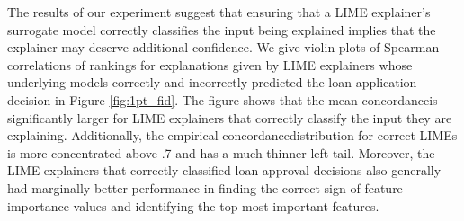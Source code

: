 \documentclass[mnsc,blindrev]{informs3}
\begin{document}
            The results of our experiment suggest that ensuring that a LIME explainer's surrogate model correctly classifies the input being explained implies that the explainer may deserve additional confidence. We give violin plots of Spearman correlations of rankings for explanations given by LIME explainers whose underlying models correctly and incorrectly predicted the loan application decision in Figure \ref{fig:1pt_fid}. The figure shows that the mean concordanceis significantly larger for LIME explainers that correctly classify the input they are explaining. Additionally, the empirical concordancedistribution for correct LIMEs is more concentrated above .7 and has a much thinner left tail. Moreover, the LIME explainers that correctly classified loan approval decisions also generally had marginally better performance in finding the correct sign of feature importance values and identifying the top most important features. 
                    
        
                    
\end{document}
